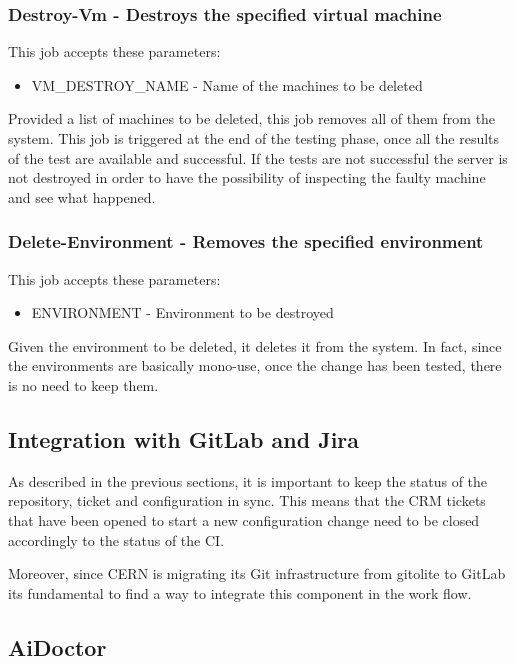 \subsubsection{Destroy-Vm - Destroys the specified virtual machine}

This job accepts these parameters:

\begin{itemize}
  \item VM\_DESTROY\_NAME - Name of the machines to be deleted
\end{itemize}

Provided a list of machines to be deleted, this job removes all of them
from the system. This job is triggered at the end of the testing phase,
once all the results of the test are available and successful. If the
tests are not successful the server is not destroyed in order to have the
possibility of inspecting the faulty machine and see what happened.

\subsubsection{Delete-Environment - Removes the specified environment}

This job accepts these parameters:

\begin{itemize}
  \item ENVIRONMENT - Environment to be destroyed
\end{itemize}

Given the environment to be deleted, it deletes it from the system. In
fact, since the environments are basically mono-use, once the change has
been tested, there is no need to keep them.

\subsection{Integration with GitLab and Jira}

As described in the previous sections, it is important to keep the status
of the repository, ticket and configuration in sync. This means that the
CRM tickets that have been opened to start a new configuration change need
to be closed accordingly to the status of the CI.

Moreover, since CERN is migrating its Git infrastructure from gitolite to
GitLab its fundamental to find a way to integrate this component in the
work flow.

\subsection{AiDoctor}

